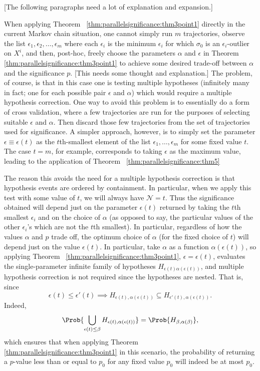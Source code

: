 \documentclass[12pt]{article}
\begin{document}
[The following paragraphs need a lot of explanation and expansion.]

When applying Theorem~%
\ref{thm:parallelsignificance:thm3point1} directly in the current Markov chain
situation, one cannot simply run \( m \) trajectories, observe the list \(
\epsilon_1 , \epsilon_2, \dots, \epsilon_ m \) where each \( \epsilon_i \)
is the minimum \( \epsilon_i \) for which \( \sigma_0 \) is an \(
\epsilon_i \)-outlier on \( X^i \), and then, post-hoc, freely choose
the parameters \( \alpha \) and \( \epsilon \) in Theorem~%
\ref{thm:parallelsignificance:thm3point1} to achieve some desired trade-off
between \( \alpha \) and the significance \( p \).  [This needs some
thought and explanation.] The problem, of course, is that in this case
one is testing multiple hypotheses (infinitely many in fact; one for
each possible pair \( \epsilon \) and \( \alpha \)) which would require
a multiple hypothesis correction.  One way to avoid this problem is to
essentially do a form of cross validation, where a few trajectories are
run for the purposes of selecting suitable \( \epsilon \) and \( \alpha \).
Then discard those few trajectories from the set of trajectories used
for significance.  A simpler approach, however, is to simply set the
parameter \( \epsilon \equiv \epsilon(t) \) as the \( t \)th-smallest
element of the list \( \epsilon_1, \dots, \epsilon_m \) for some fixed
value \( t \).  The case \( t = m \), for example, corresponds to taking
\( \epsilon \) as the maximum value, leading to the application of
Theorem~%
\ref{thm:parallelsignificance:thm5}

The reason this avoids the need for a multiple hypothesis correction is
that hypothesis events are ordered by containment.  In particular, when
we apply this test with some value of \( t \), we will always have \(
\mathcal{N} = t \).  Thus the significance obtained will depend just on
the parameter \( \epsilon(t) \) returned by taking the \( t \)th
smallest \( \epsilon_i \) and on the choice of \( \alpha \) (as opposed
to say, the particular values of the other \( \epsilon_i \)'s which are
not the \( t \)th smallest).  In particular, regardless of how the
values \( \alpha \) and \( p \) trade off, the optimum choice of \(
\alpha \) (for the fixed choice of \( t \)) will depend just on the
value \( \epsilon(t) \).  In particular, take \( \alpha \) as a function
\( \alpha(\epsilon(t) ) \), so applying Theorem~%
\ref{thm:parallelsignificance:thm3point1}, \( \epsilon = \epsilon(t) \),
evaluates the single-parameter infinite family of hypotheses \( H_{\epsilon
(t) \alpha(\epsilon(t)) } \), and multiple hypothesis correction is not
required since the hypotheses are nested.  That is, since
\[
    \epsilon(t) \le \epsilon' (t) \implies H_{\epsilon(t),\alpha(\epsilon
    (t) )} \subseteq H_{\epsilon' (t) ,\alpha(\epsilon(t) )}.
\] Indeed,
\[
    \Prob{ \bigcup_{\epsilon(t) \le \beta } H_{\epsilon(t) ,\alpha(\epsilon
    (t))} } = \Prob{H_{\beta, \alpha(\beta)}},
\] which ensures that when applying Theorem~%
\ref{thm:parallelsignificance:thm3point1} in this scenario, the probability of
returning a \( p \)-value less than or equal to \( p_0 \) for any fixed
value \( p_0 \) will indeed be at most \( p_0 \).
\end{document}
